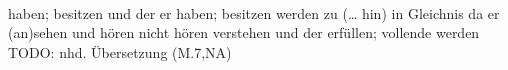 \begin{exe}
\ex \label{ex:M1162} \gll {}      \object{************* }      \object{******* }      \object{***** }      \\
{haben; besitzen} {und} {der} {er} {haben; besitzen} {werden} {} {zu (… hin)} {in} {Gleichnis} {da} {er} {} {(an)sehen} {und} {hören} {nicht} {hören} {} {verstehen} {und} {der} {erfüllen; vollende} {werden}\\
\glt TODO: nhd. Übersetzung (M.7,NA)
\end{exe}
